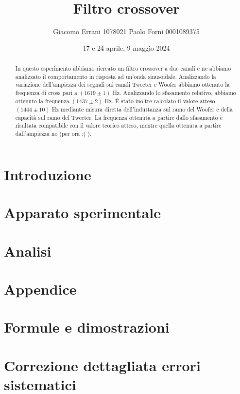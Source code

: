 \documentclass[12pt,a4paper]{article}
\title{Filtro crossover} %
\date{17 e 24 aprile, 9 maggio 2024}
\author{Giacomo Errani 1078021 Paolo Forni 0001089375}
\begin{document}
\newcommand{\theoryF}{ $(1444 \pm 10)$ Hz}
\newcommand{\amplitudeF}{$(1619 \pm 1)$ Hz}
\newcommand{\phaseF}{$(1437 \pm 2)$ Hz}

\maketitle

\begin{abstract}

In questo esperimento abbiamo ricreato un filtro crossover a due canali e ne abbiamo analizzato il comportamento
in risposta ad un'onda sinusoidale. Analizzando la variazione dell'ampiezza dei segnali sui canali Tweeter e Woofer
abbiamo ottenuto la frequenza di cross pari a \amplitudeF. Analizzando lo sfasamento relativo, abbiamo ottenuto la
frequenza \phaseF. È stato inoltre calcolato il valore atteso \theoryF \hspace{1pt}
mediante misura diretta dell'induttanza sul ramo del Woofer e della capacità sul ramo del Tweeter.
La frequenza ottenuta a partire dallo sfasamento è risultata compatibile con il valore teorico atteso, mentre quella
ottenuta a partire dall'ampiezza no (per ora :( ).

\end{abstract}

\section{Introduzione}\label{sec:introduzione}

    

\section{Apparato sperimentale}\label{sec:apparato-sperimentale}

    

\section{Analisi}\label{sec:analisi}

    

\appendix

\section*{Appendice}

\section{Formule e dimostrazioni}\label{sec:formule-e-dimostrazioni}

    

\section{Correzione dettagliata errori sistematici}\label{sec:correzione-dettagliata-errori-sistematici}

    
\end{document}
